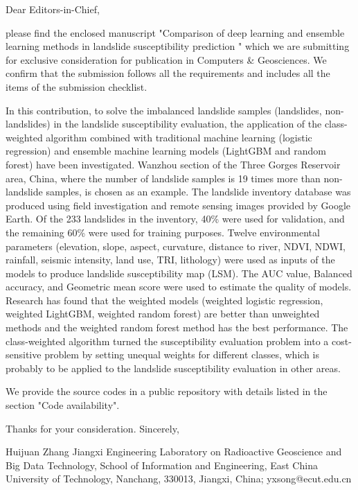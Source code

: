 \documentclass[a4paper,fleqn]{cas-sc}
\begin{document}
\begin{coverletter}

Dear Editors-in-Chief,
\newline

please find the enclosed manuscript "Comparison of deep learning and ensemble learning methods in landslide susceptibility prediction " which we are submitting for exclusive consideration for publication in Computers \& Geosciences. 
We confirm that the submission follows all the requirements and includes all the items of the submission checklist.  
\newline

In this contribution, to solve the imbalanced landslide samples (landslides, non-landslides) in the landslide susceptibility evaluation, the application of the class-weighted algorithm combined with traditional machine learning (logistic regression) and ensemble machine learning models (LightGBM and random forest) have been investigated. 
Wanzhou section of the Three Gorges Reservoir area, China, where the number of landslide samples is 19 times more than non-landslide samples, is chosen as an example. 
The landslide inventory database was produced using field investigation and remote sensing images provided by Google Earth. Of the 233 landslides in the inventory, 40\% were used for validation, and the remaining 60\% were used for training purposes. Twelve environmental parameters (elevation, slope, aspect, curvature, distance to river, NDVI, NDWI, rainfall, seismic intensity, land use, TRI, lithology) were used as inputs of the models to produce landslide susceptibility map (LSM). 
The AUC value, Balanced accuracy, and Geometric mean score were used to estimate the quality of models. 
Research has found that the weighted models (weighted logistic regression, weighted LightGBM, weighted random forest) are better than unweighted methods and the weighted random forest method has the best performance. 
The class-weighted algorithm turned the susceptibility evaluation problem into a cost-sensitive problem by setting unequal weights for different classes, which is probably to be applied to the landslide susceptibility evaluation in other areas.
\newline

We provide the source codes in a public repository with details listed in the section "Code availability".
\newline

Thanks for your consideration. 
\newline
Sincerely,
\newline

Huijuan Zhang
\newline
Jiangxi Engineering Laboratory on Radioactive Geoscience and Big Data Technology, School of Information and Engineering, East China University of Technology, Nanchang, 330013, Jiangxi, China; yxsong@ecut.edu.cn
\end{coverletter}
\end{document}
